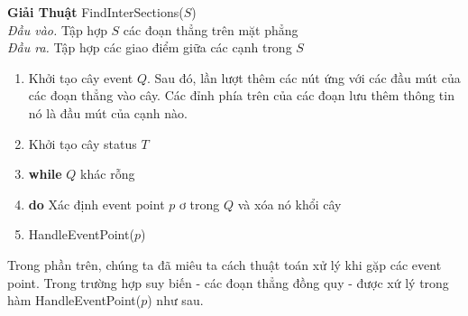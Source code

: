 \documentclass[15pt]{article}
\begin{document}
{\textbf{Giải Thuật} FindInterSections($S$) \\
\quad \textit{Đầu vào.} Tập hợp $S$ các đoạn thẳng trên mặt phẳng \\
\quad \textit{Đầu ra.} Tập hợp các giao điểm giữa các cạnh trong $S$
\begin{enumerate}
\item Khởi tạo cây event $Q$. Sau đó, lần lượt thêm các nút ứng với các đầu mút của các đoạn thẳng vào cây. Các đỉnh phía trên của các đoạn lưu thêm thông tin nó là đầu mút của cạnh nào.
\item Khởi tạo cây status $T$
\item \textbf{while} $Q$ khác rỗng
\item \quad \textbf{do} Xác định event point $p$ ơ trong $Q$ và xóa nó khổi cây
\item \quad \quad HandleEventPoint($p$)
\end{enumerate}
Trong phần trên, chúng ta đã miêu ta cách thuật toán xử lý khi gặp các event point. Trong trường hợp suy biến - các đoạn thẳng đồng quy - được xứ lý trong hàm HandleEventPoint($p$) như sau. \\

}
\end{document}
